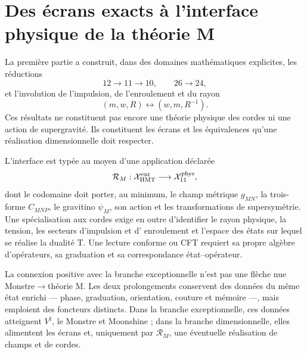 \section{Des écrans exacts à l'interface physique de la théorie M}
\label{mdp4:sec:interfaz-teoria-m-rev8}

La première partie a construit, dans des domaines mathématiques explicites, les
réductions
\[
12\longrightarrow11\longrightarrow10,
\qquad
26\longrightarrow24,
\]
et l'involution de l'impulsion, de l'enroulement et du rayon
\[
(m,w,R)\longleftrightarrow(w,m,R^{-1}).
\]
Ces résultats ne constituent pas encore une théorie physique des cordes ni une action
de supergravité. Ils constituent les écrans et les équivalences qu'une
réalisation dimensionnelle doit respecter.

L'interface est typée au moyen d'une application déclarée
\[
\mathcal R_M:\mathcal X_{\rm HMT}^{\rm enr}
\longrightarrow
\mathcal X_{11}^{\rm phys},
\]
dont le codomaine doit porter, au minimum, le champ métrique \(g_{MN}\), la
trois-forme \(C_{MNP}\), le gravitino \(\psi_M\), son action et les
transformations de supersymétrie. Une spécialisation aux cordes exige
en outre d'identifier le rayon physique, la tension, les secteurs d'impulsion et d'
enroulement et l'espace des états sur lequel se réalise la dualité
T. Une lecture conforme ou CFT requiert sa propre algèbre d'opérateurs,
sa graduation et sa correspondance état--opérateur.

La connexion positive avec la branche exceptionnelle n'est pas une flèche nue
Monstre\(\to\)théorie M. Les deux prolongements conservent des données du même
état enrichi --- phase, graduation, orientation, couture et mémoire ---,
mais emploient des foncteurs distincts. Dans la branche exceptionnelle, ces données atteignent
\(V^\natural\), le Monstre et Moonshine ; dans la branche dimensionnelle, elles alimentent
les écrans et, uniquement par \(\mathcal R_M\), une éventuelle réalisation de
champs et de cordes.

